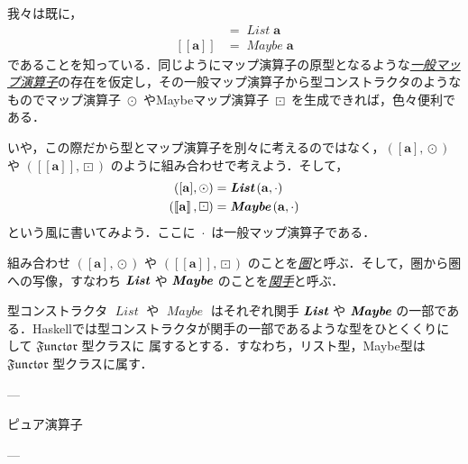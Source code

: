 \documentclass[a4paper,draft]{jsbook}
\def\[{\left[\!\left[}
\def\]{\right]\!\right]}
\newcommand{\programminglanguage}[1]{\textsf{#1}}
\newcommand{\haskell}{\programminglanguage{Haskell}}
\newcommand{\keyword}[1]{{\underline{\emph{#1}}}}
\newcommand{\mType}[1]{\mathbf{#1}}
\newcommand{\mListType}[1]{[\mType{#1}]}
\newcommand{\mMaybeType}[1]{\[\mType{#1}\]}
\newcommand{\mFunctor}[1]{\textit{\textbf{#1}}}
\newcommand{\mTypeConstructor}[1]{\mathit{#1}} %
\newcommand{\mSpecialTypeClass}[1]{\mathfrak{#1}} %
\newcommand{\mFunctorTypeClass}{\mSpecialTypeClass{Functor}}
\newcommand{\mTupleWith}[1]{\left(#1\right)}
\DeclareMathOperator{\mMap}{\cdot}
\DeclareMathOperator{\mMapList}{\odot}
\DeclareMathOperator{\mMapMaybe}{\boxdot}
\DeclareMathOperator{\mListTypeConstructor}{\mTypeConstructor{List}}
\DeclareMathOperator{\mMaybeTypeConstructor}{\mTypeConstructor{Maybe}}
\DeclareMathOperator{\mListFunctor}{\mFunctor{List}}
\DeclareMathOperator{\mMaybeFunctor}{\mFunctor{Maybe}}
\DeclareMathOperator{\mListProjection}{\xmapsto{\;\mListFunctor\;}}
\DeclareMathOperator{\mMaybeProjection}{\xmapsto{\;\mMaybeFunctor\;}}
\newcommand{\mathFunctor}[1]{\textsl{#1}} %
\newcommand{\mathListWith}[1]{\left[#1\right]}
\newcommand{\mathMaybeWith}[1]{\[#1\]}
\newcommand{\mathPureWith}[1]{\left\langle#1\right\rangle}
\DeclareMathOperator{\mathListFunctor}{\mathFunctor{List}}
\DeclareMathOperator{\mathMaybeFunctor}{\mathFunctor{Maybe}}
\begin{document}
我々は既に，
\begin{align}
\mListType{a}&=\mListTypeConstructor\mType{a}\\
\mMaybeType{a}&=\mMaybeTypeConstructor\mType{a}
\end{align}
であることを知っている．同じようにマップ演算子の原型となるような\keyword{一般マップ演算子}の存在を仮定し，その一般マップ演算子から型コンストラクタのようなものでマップ演算子 $\mMapList$ やMaybeマップ演算子 $\mMapMaybe$ を生成できれば，色々便利である．

いや，この際だから型とマップ演算子を別々に考えるのではなく，$\mTupleWith{\mListType{a},\mMapList}$ や $\mTupleWith{\mMaybeType{a},\mMapMaybe}$ のように組み合わせで考えよう．そして，
\begin{align}
\mTupleWith{\mListType{a},\mMapList}&=\mListFunctor\mTupleWith{\mType{a},\mMap}\\
\mTupleWith{\mMaybeType{a},\mMapMaybe}
&=\mMaybeFunctor\mTupleWith{\mType{a},\mMap}
\end{align}
という風に書いてみよう．ここに $\mMap$ は一般マップ演算子である．

組み合わせ $\mTupleWith{\mListType{a},\mMapList}$ や $\mTupleWith{\mMaybeType{a},\mMapMaybe}$ のことを\keyword{圏}と呼ぶ．そして，圏から圏への写像，すなわち $\mListFunctor$ や $\mMaybeFunctor$ のことを\keyword{関手}と呼ぶ．

型コンストラクタ $\mListTypeConstructor$ や $\mMaybeTypeConstructor$ はそれぞれ関手 $\mListFunctor$ や $\mMaybeFunctor$ の一部である．\haskell では型コンストラクタが関手の一部であるような型をひとくくりにして $\mFunctorTypeClass$ 型クラスに
属するとする．すなわち，リスト型，Maybe型は $\mFunctorTypeClass$ 型クラスに属す．

---

ピュア演算子

---

\end{document}
